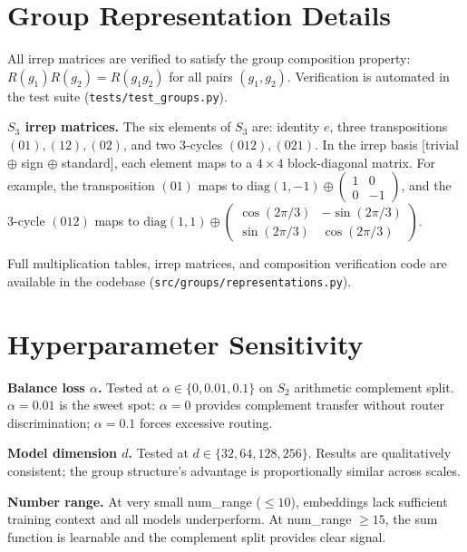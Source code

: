 \documentclass[10pt, letterpaper]{article}
\begin{document}
\appendix

\section{Group Representation Details}
\label{app:groups}

All irrep matrices are verified to satisfy the group composition property: $R(g_1)R(g_2) = R(g_1 g_2)$ for all pairs $(g_1, g_2)$. Verification is automated in the test suite (\texttt{tests/test\_groups.py}).

\textbf{$S_3$ irrep matrices.} The six elements of $S_3$ are: identity $e$, three transpositions $(01), (12), (02)$, and two 3-cycles $(012), (021)$. In the irrep basis [trivial $\oplus$ sign $\oplus$ standard], each element maps to a $4 \times 4$ block-diagonal matrix. For example, the transposition $(01)$ maps to $\text{diag}(1, -1) \oplus \begin{pmatrix} 1 & 0 \\ 0 & -1 \end{pmatrix}$, and the 3-cycle $(012)$ maps to $\text{diag}(1, 1) \oplus \begin{pmatrix} \cos(2\pi/3) & -\sin(2\pi/3) \\ \sin(2\pi/3) & \cos(2\pi/3) \end{pmatrix}$.

Full multiplication tables, irrep matrices, and composition verification code are available in the codebase (\texttt{src/groups/representations.py}).

\section{Hyperparameter Sensitivity}

\textbf{Balance loss $\alpha$.} Tested at $\alpha \in \{0, 0.01, 0.1\}$ on $S_2$ arithmetic complement split. $\alpha = 0.01$ is the sweet spot: $\alpha = 0$ provides complement transfer without router discrimination; $\alpha = 0.1$ forces excessive routing.

\textbf{Model dimension $d$.} Tested at $d \in \{32, 64, 128, 256\}$. Results are qualitatively consistent; the group structure's advantage is proportionally similar across scales.

\textbf{Number range.} At very small num\_range ($\leq 10$), embeddings lack sufficient training context and all models underperform. At num\_range $\geq 15$, the sum function is learnable and the complement split provides clear signal.
\end{document}
